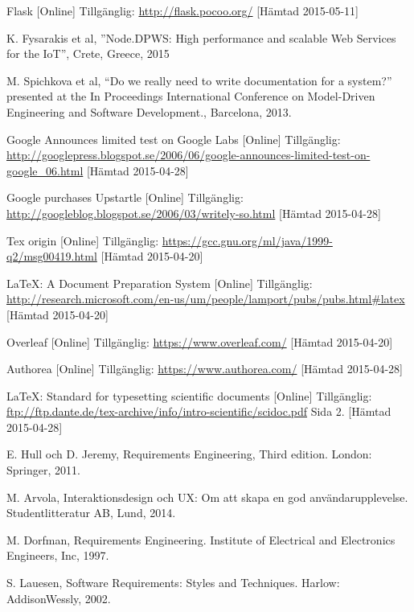\begin{thebibliography}{9}
Flask [Online] Tillgänglig:
\url{http://flask.pocoo.org/}
[Hämtad 2015-05-11]
	
K. Fysarakis et al, ''Node.DPWS: High performance and scalable Web Services for the IoT'', Crete, Greece, 2015


M. Spichkova et al, “Do we really need to write documentation for a system?” presented at the In Proceedings International Conference on Model-Driven Engineering and Software Development., Barcelona, 2013.

Google Announces limited test on Google Labs [Online] Tillgänglig: 
\url{http://googlepress.blogspot.se/2006/06/google-announces-limited-test-on-google_06.html} [Hämtad 2015-04-28]

Google purchases Upstartle [Online] Tillgänglig: 
\url{http://googleblog.blogspot.se/2006/03/writely-so.html} [Hämtad 2015-04-28]

Tex origin [Online] Tillgänglig: 
\url{https://gcc.gnu.org/ml/java/1999-q2/msg00419.html} [Hämtad 2015-04-20]

LaTeX: A Document Preparation System [Online] Tillgänglig: 
\url{http://research.microsoft.com/en-us/um/people/lamport/pubs/pubs.html#latex} [Hämtad 2015-04-20]

Overleaf [Online] Tillgänglig: 
\url{https://www.overleaf.com/} [Hämtad 2015-04-20]

Authorea [Online] Tillgänglig: 
\url{https://www.authorea.com/} [Hämtad 2015-04-28]
 
LaTeX: Standard for typesetting scientific documents [Online] Tillgänglig: 
\url{ftp://ftp.dante.de/tex-archive/info/intro-scientific/scidoc.pdf} Sida 2. [Hämtad 2015-04-28]


E. Hull och D. Jeremy, Requirements Engineering, Third edition. London: Springer, 2011.

M. Arvola, Interaktionsdesign och UX: Om att skapa en god användarupplevelse. Studentlitteratur AB, Lund, 2014.

M. Dorfman, Requirements Engineering. Institute of Electrical and Electronics Engineers, Inc, 1997.

S. Lauesen, Software Requirements: Styles and Techniques. Harlow: AddisonWessly, 2002.



\end{thebibliography}
